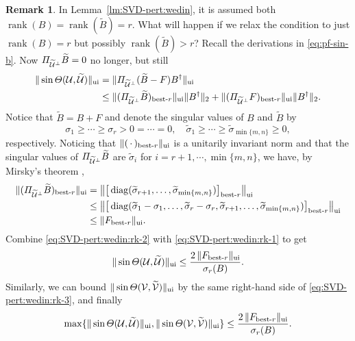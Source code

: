 \documentclass[11pt]{article}
\def\cU{{\cal U}}
\def\cV{{\cal V}}
\DeclareMathOperator{\diag}{diag}
\DeclareMathOperator{\rank}{rank}
\DeclareMathOperator{\UI}{ui}
\def\wtd{\widetilde}
\def\bestr{\mbox{\scriptsize\rm best-$r$}}
\theoremstyle{definition}
\newtheorem{remark}{Remark}[section]
\numberwithin{equation}{section}
\numberwithin{figure}{section}
\numberwithin{table}{section}
\begin{document}
\iffalse
\begin{remark}\label{rk:SVD-pert:wedin}
In Lemma~\ref{lm:SVD-pert:wedin}, it is assumed both $\rank(B)=\rank(\wtd B)=r$.
What will happen if we relax the condition to just $\rank(B)=r$ but possibly
$\rank(\wtd B)>r$? Recall the derivations in \eqref{eq:pf-sin-b}. Now $\Pi_{\wtd\cU^{\perp}}\wtd B=0$ no longer, but still
\begin{align}
\|\sin\Theta(\cU,\wtd\cU)\|_{\UI}
  &=\|\Pi_{\wtd\cU^{\perp}}(\wtd B-F)B^{\dagger}\|_{\UI} \nonumber\\
  &\le\|(\Pi_{\wtd\cU^{\perp}}\wtd B)_{\bestr}\|_{\UI}\|B^{\dagger}\|_2+\|(\Pi_{\wtd\cU^{\perp}}F)_{\bestr}\|_{\UI}\|B^{\dagger}\|_2.
       \label{eq:SVD-pert:wedin:rk-1}
\end{align}
Notice that $\wtd B=B+F$ and denote the singular values of $B$ and $\wtd B$ by
$$
\sigma_1\ge\cdots\ge\sigma_r> 0=\cdots=0, \quad
\wtd\sigma_1\ge\cdots\ge\wtd\sigma_{\min\{m,n\}}\ge 0,
$$
respectively. Noticing that $\|(\,\cdot\,)_{\bestr}\|_{\UI}$ is a unitarily invariant norm and that
the singular values of $\Pi_{\wtd\cU^{\perp}}\wtd B$ are $\wtd\sigma_i$ for $i=r+1,\cdots,\min\{m,n\}$,
we have, by Mirsky's theorem \cite[p.204]{stsu:1990},
\begin{align}
\|(\Pi_{\wtd\cU^{\perp}}\wtd B)_{\bestr}\|_{\UI}
   &=\big\|\big[\diag(\wtd\sigma_{r+1},\ldots,\wtd\sigma_{\min\{m,n\}})\big]_{\bestr}\big\|_{\UI} \nonumber\\
   &\le\big\|\big[\diag(\wtd\sigma_1-\sigma_1,\ldots,\wtd\sigma_r-\sigma_r,\wtd\sigma_{r+1},\ldots,\wtd\sigma_{\min\{m,n\}})\big]_{\bestr}\big\|_{\UI}
       \nonumber\\
   &\le\|F_{\bestr}\|_{\UI}. \label{eq:SVD-pert:wedin:rk-2}
\end{align}
Combine \eqref{eq:SVD-pert:wedin:rk-2} with \eqref{eq:SVD-pert:wedin:rk-1} to get
\begin{equation}\label{eq:SVD-pert:wedin:rk-3}
\|\sin\Theta(\cU,\wtd\cU)\|_{\UI}\le\frac{2\,\|F_{\bestr}\|_{\UI}}{\sigma_r(B)}.
\end{equation}
Similarly, we can bound $\|\sin\Theta(\cV,\wtd\cV)\|_{\UI}$ by the same right-hand side of \eqref{eq:SVD-pert:wedin:rk-3},
and finally
\begin{equation}\label{eq:SVD-pert:wedin:rk-4}
\max\{\|\sin\Theta(\cU,\wtd\cU)\|_{\UI},\|\sin\Theta(\cV,\wtd\cV)\|_{\UI}\}\le\frac{2\,\|F_{\bestr}\|_{\UI}}{\sigma_r(B)}.
\end{equation}

\end{remark}
\end{document}
